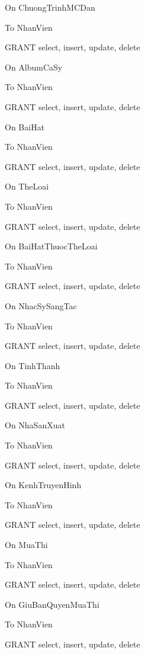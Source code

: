 \documentclass{report}
\begin{document}
On ChuongTrinhMCDan

To NhanVien

\bigskip

GRANT select, insert, update, delete

On AlbumCaSy

To NhanVien

\bigskip

GRANT select, insert, update, delete

On BaiHat

To NhanVien

\bigskip

GRANT select, insert, update, delete

On TheLoai

To NhanVien

\bigskip

GRANT select, insert, update, delete

On BaiHatThuocTheLoai

To NhanVien

\bigskip

GRANT select, insert, update, delete

On NhacSySangTac

To NhanVien

\bigskip

GRANT select, insert, update, delete

On TinhThanh

To NhanVien

\bigskip

GRANT select, insert, update, delete

On NhaSanXuat

To NhanVien

\bigskip

GRANT select, insert, update, delete

On KenhTruyenHinh

To NhanVien

\bigskip

GRANT select, insert, update, delete

On MuaThi

To NhanVien

\bigskip

GRANT select, insert, update, delete

On GiuBanQuyenMuaThi

To NhanVien

\bigskip

GRANT select, insert, update, delete
\end{document}
